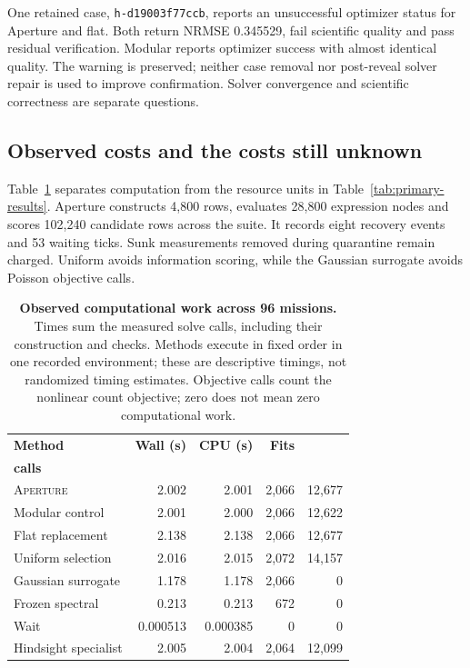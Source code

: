 \documentclass[11pt,letterpaper]{article}
\newcommand{\ap}{\textsc{Aperture}}
\newcommand{\code}[1]{\texttt{\small #1}}
\begin{document}
One retained case, \code{h-d19003f77ccb}, reports an unsuccessful optimizer status for Aperture and flat. Both return NRMSE 0.345529, fail scientific quality and pass residual verification. Modular reports optimizer success with almost identical quality. The warning is preserved; neither case removal nor post-reveal solver repair is used to improve confirmation. Solver convergence and scientific correctness are separate questions.

\subsection{Observed costs and the costs still unknown}

Table~\ref{tab:compute} separates computation from the resource units in Table~\ref{tab:primary-results}. Aperture constructs 4,800 rows, evaluates 28,800 expression nodes and scores 102,240 candidate rows across the suite. It records eight recovery events and 53 waiting ticks. Sunk measurements removed during quarantine remain charged. Uniform avoids information scoring, while the Gaussian surrogate avoids Poisson objective calls.

\begin{table}[htbp]
\centering\small
\begin{tabularx}{\linewidth}{@{}Xrrrr@{}}
\toprule
\textbf{Method} & \textbf{Wall (s)} & \textbf{CPU (s)} & \textbf{Fits} & \shortstack{\textbf{Objective}\\\textbf{calls}}\\
\midrule
\ap{} & 2.002 & 2.001 & 2,066 & 12,677\\
Modular control & 2.001 & 2.000 & 2,066 & 12,622\\
Flat replacement & 2.138 & 2.138 & 2,066 & 12,677\\
Uniform selection & 2.016 & 2.015 & 2,072 & 14,157\\
Gaussian surrogate & 1.178 & 1.178 & 2,066 & 0\\
Frozen spectral & 0.213 & 0.213 & 672 & 0\\
Wait & 0.000513 & 0.000385 & 0 & 0\\
Hindsight specialist & 2.005 & 2.004 & 2,064 & 12,099\\
\bottomrule
\end{tabularx}
\caption{\textbf{Observed computational work across 96 missions.} Times sum the measured solve calls, including their construction and checks. Methods execute in fixed order in one recorded environment; these are descriptive timings, not randomized timing estimates. Objective calls count the nonlinear count objective; zero does not mean zero computational work.}
\label{tab:compute}
\end{table}
\end{document}

